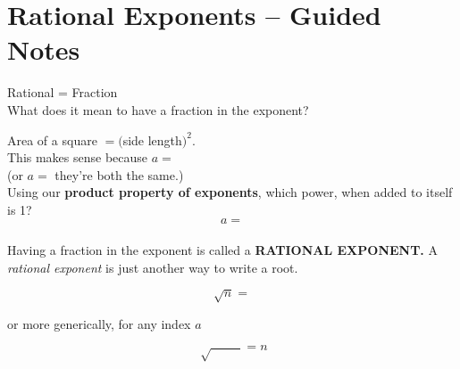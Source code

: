 \documentclass[12pt]{article}
\begin{document}
\pagebreak

\section{Rational Exponents -- Guided Notes}

Rational = Fraction \\

What does it mean to have a fraction in the exponent?\\

\begin{center}
\end{center}


Area of a square $=($side length$)^2$.\\

This makes sense because $a=$\\

(or $a=$ \hspace{3in} they're both the same.)\\

Using our \textbf{product property of exponents}, which power, when added to itself is 1? $$a=$$\\

Having a fraction in the exponent is called a \textbf{RATIONAL EXPONENT.} A \textit{rational exponent} is just another way to write a root. 

\begin{large}
	$$\sqrt{n}= $$

\end{large}


or more generically, for any index $a$\\

\begin{large}

	$$\sqrt[]{\hspace{1cm}}=n$$ 
	
\end{large}
\end{document}
